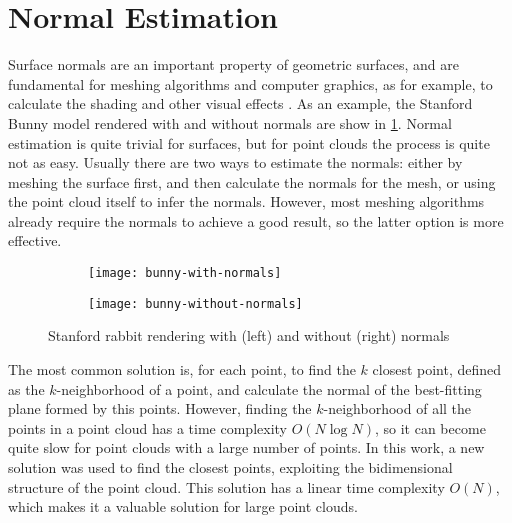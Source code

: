 \section{Normal Estimation}
\label{section:normal-estimation}

Surface normals are an important property of geometric surfaces, and are fundamental for meshing algorithms and computer graphics, as for example, to calculate the shading and other visual effects \cite{pcl-normal-estimation}. As an example, the Stanford Bunny model \cite{stanford-bunny} rendered with and without normals are show in \cref{figure:bunny-normals}. Normal estimation is quite trivial for surfaces, but for point clouds the process is quite not as easy. Usually there are two ways to estimate the normals: either by meshing the surface first, and then calculate the normals for the mesh, or using the point cloud itself to infer the normals. However, most meshing algorithms already require the normals to achieve a good result, so the latter option is more effective.

\begin{figure}[h]
    
    \centering
    \begin{subfigure}{0.4\textwidth}
        \centering
        \texttt{[image: bunny-with-normals]}     
    \end{subfigure}%
    \begin{subfigure}{0.4\textwidth}
        \centering
        \texttt{[image: bunny-without-normals]}     
    \end{subfigure}

    \caption{Stanford rabbit \cite{stanford-bunny} rendering with (left) and without (right) normals}
    \label{figure:bunny-normals}

\end{figure}

The most common solution is, for each point, to find the $k$ closest point, defined as the $k$-neighborhood of a point, and calculate the normal of the best-fitting plane formed by this points. However, finding the $k$-neighborhood of all the points in a point cloud has a time complexity $O(N \log N)$, so it can become quite slow for point clouds with a large number of points. In this work, a new solution was used to find the closest points, exploiting the bidimensional structure of the point cloud. This solution has a linear time complexity $O(N)$, which makes it a valuable solution for large point clouds.

